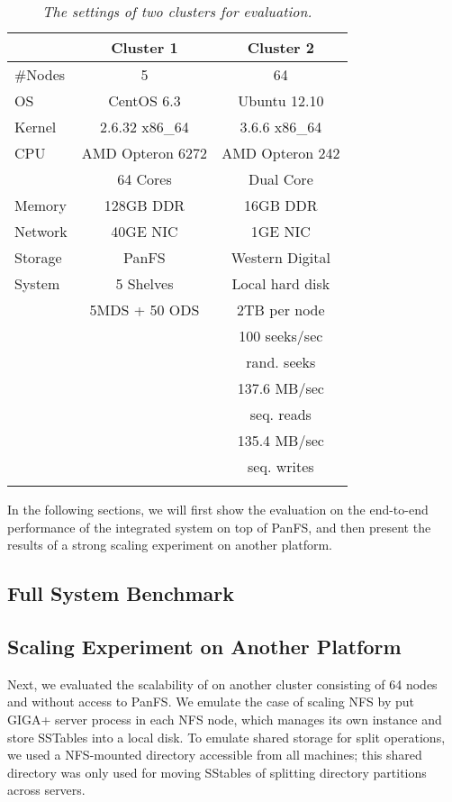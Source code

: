 \begin{table}
\begin{tabular}{lcc}
\toprule
      & Cluster 1 & Cluster 2 \\
\midrule
\#Nodes & 5 & 64 \\
\hline
OS &   CentOS 6.3 &  Ubuntu 12.10 \\
Kernel & 2.6.32 x86\_64 & 3.6.6 x86\_64 \\
\hline
CPU & AMD Opteron 6272 &  AMD Opteron 242 \\
    & 64 Cores & Dual Core\\
\hline
Memory & 128GB DDR &  16GB DDR \\
\hline
Network & 40GE NIC &  1GE NIC  \\
\hline
Storage & PanFS & Western Digital \\
System &      5 Shelves & Local hard disk  \\
       &   5MDS + 50 ODS &  2TB per node  \\
& & 100 seeks/sec \\
& & rand. seeks   \\
& & 137.6 MB/sec  \\
& & seq. reads    \\
& & 135.4 MB/sec  \\
& & seq. writes   \\
\bottomrule \\
\end{tabular}
\caption{
\textit{The settings of two clusters for evaluation.}
}
\label{tab:setting}
\end{table}

In the following sections, we will first show the evaluation
on the end-to-end performance of the integrated system on top of PanFS,
and then present the results of a strong scaling experiment on another platform.

\subsection{Full System Benchmark}
\label{sec:fullsystem}


\subsection{Scaling Experiment on Another Platform}
Next, we evaluated the scalability of \sys on another cluster
consisting of 64 nodes and without access to PanFS.
We emulate the case of scaling NFS by put GIGA+ server process in each NFS node,
which manages its own \tfs instance and store SSTables into a local disk.
To emulate shared storage for split operations,
we used a NFS-mounted directory accessible from all machines;
this shared directory was only used for moving SStables of
splitting directory partitions across servers.

